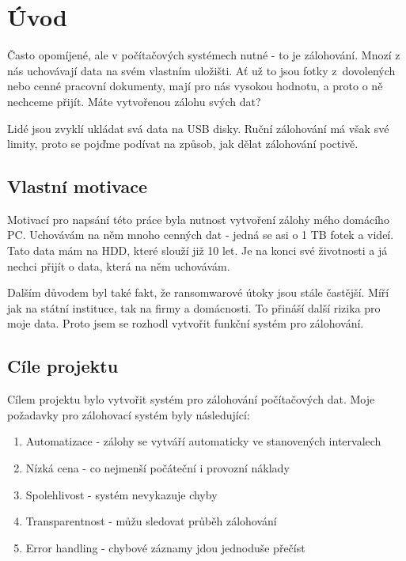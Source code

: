 \documentclass[a4paper,12pt, oneside]{book}
\begin{document}
\tableofcontents

\clearpage
\pagestyle{fancy}

\chapter{Úvod}

Často opomíjené, ale v počítačových systémech nutné - to je zálohování.
Mnozí z nás uchovávají data na svém vlastním uložišti. Ať už to jsou
fotky z dovolených nebo cenné pracovní dokumenty, mají pro nás vysokou hodnotu, a proto 
o ně nechceme přijít. Máte vytvořenou zálohu svých dat? 

Lidé jsou zvyklí ukládat svá data na USB disky. Ruční zálohování má však své limity,
proto se pojďme podívat na způsob, jak dělat zálohování poctivě.


\section{Vlastní motivace}

Motivací pro napsání této práce byla nutnost vytvoření zálohy mého
domácího PC. Uchovávám na něm mnoho cenných dat -
jedná se asi o 1 TB fotek a videí. Tato data mám na HDD, které
slouží již 10 let. Je na konci své životnosti a já nechci přijít o data,
která na něm uchovávám. 

Dalším důvodem byl také fakt, že ransomwarové útoky jsou stále častější. Míří
jak na státní instituce, tak na firmy a domácnosti. To přináší další rizika pro
moje data. Proto jsem se rozhodl vytvořit funkční systém 
pro zálohování.




\section{Cíle projektu}

Cílem projektu bylo vytvořit systém pro zálohování počítačových dat. Moje
požadavky pro zálohovací systém byly následující: 

\begin{enumerate}
	\item Automatizace - zálohy se vytváří automaticky ve stanovených intervalech
	\item Nízká cena - co nejmenší počáteční i provozní náklady
	\item Spolehlivost - systém nevykazuje chyby
	\item Transparentnost - můžu sledovat průběh zálohování
	\item Error handling - chybové záznamy jdou jednoduše přečíst
\end{enumerate}
\end{document}
